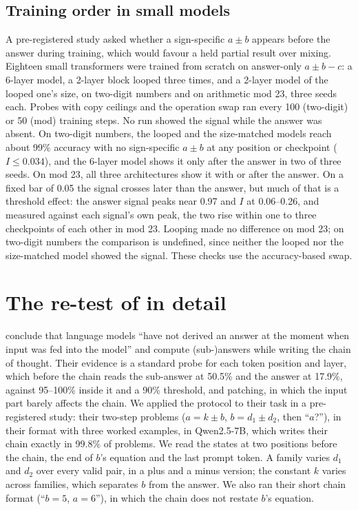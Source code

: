 \documentclass{article}
\begin{document}
\subsection{Training order in small models}\label{sec:v220}

A pre-registered study asked whether a sign-specific $a \pm b$ appears before the answer during training, which would favour a held partial result over mixing. Eighteen small transformers were trained from scratch on answer-only $a \pm b - c$: a 6-layer model, a 2-layer block looped three times, and a 2-layer model of the looped one's size, on two-digit numbers and on arithmetic mod 23, three seeds each. Probes with copy ceilings and the operation swap ran every 100 (two-digit) or 50 (mod) training steps. No run showed the signal while the answer was absent. On two-digit numbers, the looped and the size-matched models reach about 99\% accuracy with no sign-specific $a \pm b$ at any position or checkpoint ($I \le 0.034$), and the 6-layer model shows it only after the answer in two of three seeds. On mod 23, all three architectures show it with or after the answer. On a fixed bar of 0.05 the signal crosses later than the answer, but much of that is a threshold effect: the answer signal peaks near 0.97 and $I$ at 0.06--0.26, and measured against each signal's own peak, the two rise within one to three checkpoints of each other in mod 23. Looping made no difference on mod 23; on two-digit numbers the comparison is undefined, since neither the looped nor the size-matched model showed the signal. These checks use the accuracy-based swap.

\section{The re-test of \citet{kudo2026} in detail}\label{app:kudo}

\citet{kudo2026} conclude that language models ``have not derived an answer at the moment when input was fed into the model'' and compute (sub-)answers while writing the chain of thought. Their evidence is a standard probe for each token position and layer, which before the chain reads the sub-answer at 50.5\% and the answer at 17.9\%, against 95--100\% inside it and a 90\% threshold, and patching, in which the input part barely affects the chain. We applied the protocol to their task in a pre-registered study: their two-step problems ($a = k \pm b$, $b = d_1 \pm d_2$, then ``$a$?''), in their format with three worked examples, in Qwen2.5-7B, which writes their chain exactly in 99.8\% of problems. We read the states at two positions before the chain, the end of $b$'s equation and the last prompt token. A family varies $d_1$ and $d_2$ over every valid pair, in a plus and a minus version; the constant $k$ varies across families, which separates $b$ from the answer. We also ran their short chain format (``$b = 5$, $a = 6$''), in which the chain does not restate $b$'s equation.
\end{document}
